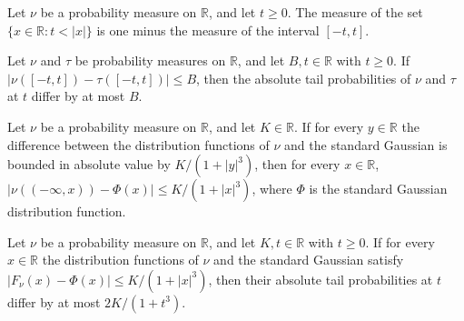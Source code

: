 \begin{theorem}
\label{FABL.absoluteTail_eq_one_sub_interval}
\leanok
{}
Let $\nu$ be a probability measure on $\mathbb R$, and let $t\ge 0$. The measure of the
set $\{x\in\mathbb R:t<|x|\}$ is one minus the measure of the interval $[-t,t]$.
\end{theorem}

\begin{theorem}
\label{FABL.absoluteTail_error_le_of_interval_error}
\leanok
{}
Let $\nu$ and $\tau$ be probability measures on $\mathbb R$, and let $B,t\in\mathbb R$
with $t\ge 0$. If $|\nu([-t,t])-\tau([-t,t])|\le B$, then the absolute tail
probabilities of $\nu$ and $\tau$ at $t$ differ by at most $B$.
\end{theorem}

\begin{lemma}
\label{FABL.strictCdfError_le_nonuniform}
\leanok
{}
Let $\nu$ be a probability measure on $\mathbb{R}$, and let $K\in\mathbb{R}$. If for
every $y\in\mathbb{R}$ the difference between the distribution functions of $\nu$ and
the standard Gaussian is bounded in absolute value by $K/(1+|y|^3)$, then for every
$x\in\mathbb{R}$, $\left|\nu((-\infty,x))-\Phi(x)\right|\le K/(1+|x|^3)$, where $\Phi$
is the standard Gaussian distribution function.
\end{lemma}

\begin{theorem}
\label{FABL.absoluteTail_error_le_nonuniform}
\leanok
{}
Let $\nu$ be a probability measure on $\mathbb R$, and let $K,t\in\mathbb R$ with $t\ge
0$. If for every $x\in\mathbb R$ the distribution functions of $\nu$ and the standard
Gaussian satisfy $|F_\nu(x)-\Phi(x)|\le K/(1+|x|^3)$, then their absolute tail
probabilities at $t$ differ by at most $2K/(1+t^3)$.
\end{theorem}


